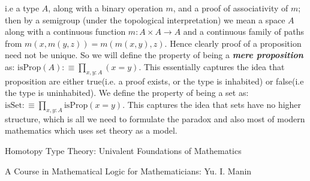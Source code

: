 \documentclass[11pt]{article}
\theoremstyle{definition}
\theoremstyle{plain}
\theoremstyle{remark}
\begin{document}
i.e a type $A$, along with a binary operation $m$, and a proof of associativity of $m$; then
by a semigroup (under the topological interpretation) we mean a space $A$ along with a
continuous function $m : A\times A \to A$ and a continuous family of paths from 
$m(x,m(y,z)) = m(m(x,y),z)$. Hence clearly proof of a proposition need not be unique. So
we will define the property of being a \textbf{\textit{mere proposition}} as:
${ \text{isProp}(A) :\equiv \prod_{x,y : A} (x = y) }$. This essentially captures the idea
that proposition are either true(i.e. a proof exists, or the type is inhabited) or false(i.e
the type is uninhabited). We define the property of being a set as: 
${ \text{isSet} :\equiv \prod_{x,y:A} \text{isProp}(x=y)  }$. This captures the idea that sets
have no higher structure, which is all we need to formulate the paradox and also most of
modern mathematics which uses set theory as a model.   

\begin{thebibliography}{99}

Homotopy Type Theory: Univalent Foundations of Mathematics

A Course in Mathematical Logic for Mathematicians: Yu. I. Manin 

\end{thebibliography}
\end{document}
